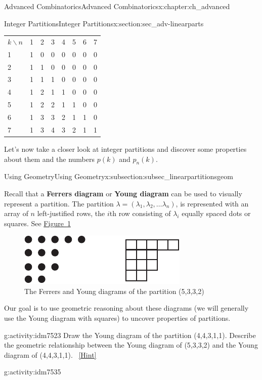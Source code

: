 \documentclass[oneside,10pt,]{book}
\newcommand{\terminology}[1]{\textbf{#1}}
\numberwithin{equation}{chapter}
\newcommand{\hrulethin}  {\noalign{\hrule height 0.04em}}
\begin{document}
\begin{chapterptx}{Advanced Combinatorics}{}{Advanced Combinatorics}{}{}{x:chapter:ch_advanced}
\begin{sectionptx}{Integer Partitions}{}{Integer Partitions}{}{}{x:section:sec_adv-linearparts}
\begin{introduction}{}
\begin{sidebyside}{1}{0}{0}{0}
\begin{sbspanel}{1}
{\begin{tabular}{llllllll}
\(k\backslash n\)&1&2&3&4&5&6&7\tabularnewline\hrulethin
1&1&0&0&0&0&0&0\tabularnewline[0pt]
2&1&1&0&0&0&0&0\tabularnewline[0pt]
3&1&1&1&0&0&0&0\tabularnewline[0pt]
4&1&2&1&1&0&0&0\tabularnewline[0pt]
5&1&2&2&1&1&0&0\tabularnewline[0pt]
6&1&3&3&2&1&1&0\tabularnewline[0pt]
7&1&3&4&3&2&1&1
\end{tabular}
\par}
\end{sbspanel}%
\end{sidebyside}%
\par
Let's now take a closer look at integer partitions and discover some properties about them and the numbers \(p(k)\) and \(p_n(k)\).%
\end{introduction}%
%
%
\typeout{************************************************}
\typeout{************************************************}
%
\begin{subsectionptx}{Using Geometry}{}{Using Geometry}{}{}{x:subsection:subsec_linearpartitionsgeom}
\begin{introduction}{}%
Recall that a \terminology{Ferrers diagram} or \terminology{Young diagram} can be used to visually represent a partition.  The partition \(\lambda = (\lambda_1,\lambda_2,\ldots \lambda_n)\), is represented with an array of \(n\) left-justified rows, the \(i\)th row consisting of \(\lambda_i\) equally spaced dots or squares.  See \hyperref[x:figure:FerrersYoung-repeat]{Figure~\ref{x:figure:FerrersYoung-repeat}}%
\begin{figure}
\centering
\includegraphics[width=0.45\linewidth]{images/FerrersYoung}
\caption{The Ferrers and Young diagrams of the partition (5,3,3,2)\label{x:figure:FerrersYoung-repeat}}
\end{figure}
Our goal is to use geometric reasoning about these diagrams (we will generally use the Young diagram with squares) to uncover properties of partitions.%
\begin{activity}{}{g:activity:idm7523}%
Draw the Young diagram of the partition (4,4,3,1,1). Describe the geometric relationship between the Young diagram of (5,3,3,2) and the Young diagram of (4,4,3,1,1).%
\qquad~\hfill{\tiny\hyperlink{g:hint:idm7526-back}{[Hint]}}\end{activity}
\begin{activity}{}{g:activity:idm7535}%

\end{activity}
\end{introduction}
\end{subsectionptx}
\end{sectionptx}
\end{chapterptx}
\end{document}
